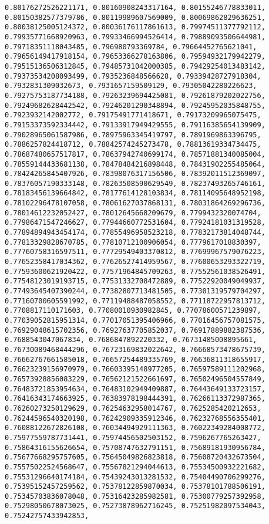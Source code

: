 \documentclass[11pt]{article}
\begin{document}
\begin{Verbatim}[commandchars=\\\{\}]
0.80176272526221171, 0.80160908243317164, 0.80155246778833011, 0.80150382577379786, 0.80119989607569009, 0.80069862829636251, 0.80038125005124372, 0.80036176117861613, 0.79974511377792112, 0.79935771668920963, 0.79933466994526414, 0.79889093506644981, 0.79718351118043485, 0.796980793369784, 0.79664452765621041, 0.79656149417918154, 0.79653366278163806, 0.79594932179942279, 0.79515136506312845, 0.79485731042000385, 0.79429254013483142, 0.79373534208093499, 0.7935236848566628, 0.79339428727918304, 0.7932831309032673, 0.7931657159509129, 0.79305042280226623, 0.79275753187734188, 0.79263239694425081, 0.79261879202022756, 0.79249682628442542, 0.79246201290348894, 0.79245952035848755, 0.7923932142002772, 0.79175491771418671, 0.79173209965075475, 0.79153373592334442, 0.79133917949429555, 0.79116385654139909, 0.79028965061587986, 0.78975963345419797, 0.7891969863396795, 0.7886257824418712, 0.78842574245273478, 0.78813619334734475, 0.78687480657517817, 0.78637942740699174, 0.78571881340085004, 0.78559144433681138, 0.78478484216898448, 0.78431902255485064, 0.78424265845407926, 0.78398076317156506, 0.78392011512369097, 0.78376057190333148, 0.78263508590629549, 0.78237493265746161, 0.78183456139664842, 0.78177614128103834, 0.78114095648952198, 0.78102296478107058, 0.78061627037868131, 0.78031864269296736, 0.78014612232052427, 0.78012645668209679, 0.7799432320074704, 0.77986471547246627, 0.77944660772531604, 0.77924181031319528, 0.77894894943454174, 0.77855496958523218, 0.77832173814048744, 0.77813329828670785, 0.77810712100906054, 0.7779617018830397, 0.77760758316597511, 0.77729549403370812, 0.77699967579076223, 0.77652358417034362, 0.77626527414959567, 0.77600653293322719, 0.77593600621920422, 0.77571964845709263, 0.77552561038526491, 0.77548123019193715, 0.77531332708472889, 0.77522920049049937, 0.77493645407390244, 0.77382807713481505, 0.77301319579704297, 0.77160700605591992, 0.77119488487058552, 0.77118722957813712, 0.7708817110171603, 0.77080010930982845, 0.77078600571239897, 0.77039052815951314, 0.77017051395406966, 0.77016456757081575, 0.76929048615702356, 0.76927637705852037, 0.76917889882387536, 0.7688543047067834, 0.7686847892220332, 0.76731485008895661, 0.76730089468444296, 0.76723169832022642, 0.76668573478675739, 0.76662767661585018, 0.76657254489335769, 0.76636811318655917, 0.76623239156970979, 0.76603395148977205, 0.76597589111202968, 0.76573928856083229, 0.76562121522661697, 0.76502496504557849, 0.76483721853954634, 0.76483102949409887, 0.76443649133723157, 0.76416343174663925, 0.76383978198444391, 0.76266113372987365, 0.76260273250129629, 0.76254632958014767, 0.7625285420212653, 0.76244596540320198, 0.76242909335912346, 0.76232768556355401, 0.76088122672826108, 0.76034494929111363, 0.76022349284008772, 0.75977559787731441, 0.75974456502503152, 0.7596267765263427, 0.75864316155626654, 0.75708747632791151, 0.75689181930956784, 0.75677668295757605, 0.75645049826823818, 0.75608720432673504, 0.75575022524568647, 0.75567821294044613, 0.75534500932221682, 0.75531296640174184, 0.75439243013281532, 0.75404490706299276, 0.75395152457259562, 0.75378122859870034, 0.75378101788506191, 0.75345703836078048, 0.75316423285982581, 0.75300779257392958, 0.75298050678073025, 0.75273878962716245, 0.75251982097534043, 0.75242757433942853, 
\end{Verbatim}
\end{document}
